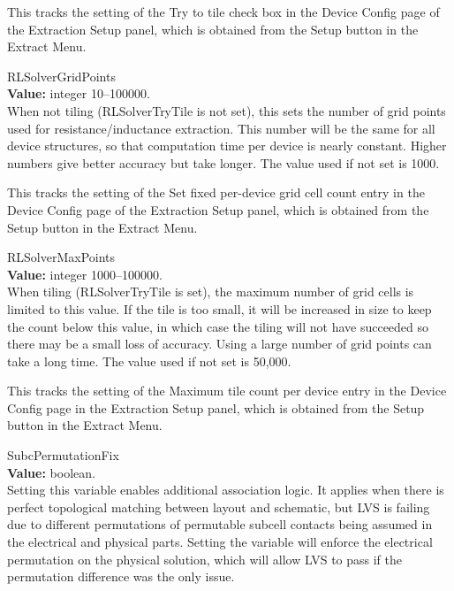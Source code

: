 \begin{description}
This tracks the setting of the {\cb Try to tile} check box in the {\cb
Device Config} page of the {\cb Extraction Setup} panel, which is
obtained from the {\cb Setup} button in the {\cb Extract Menu}.

\item{\et RLSolverGridPoints}\\
{\bf Value:} integer 10--100000.\\
When not tiling ({\et RLSolverTryTile} is not set), this sets the
number of grid points used for resistance/inductance extraction.  This
number will be the same for all device structures, so that computation
time per device is nearly constant.  Higher numbers give better
accuracy but take longer.  The value used if not set is 1000.

This tracks the setting of the {\cb Set fixed per-device grid cell
count} entry in the {\cb Device Config} page of the {\cb Extraction
Setup} panel, which is obtained from the {\cb Setup} button in the
{\cb Extract Menu}.

\item{\et RLSolverMaxPoints}\\
{\bf Value:} integer 1000--100000.\\
When tiling ({\et RLSolverTryTile} is set), the maximum number of grid
cells is limited to this value.  If the tile is too small, it will be
increased in size to keep the count below this value, in which case
the tiling will not have succeeded so there may be a small loss of
accuracy.  Using a large number of grid points can take a long time. 
The value used if not set is 50,000.

This tracks the setting of the {\cb Maximum tile count per device}
entry in the {\cb Device Config} page in the {\cb Extraction Setup}
panel, which is obtained from the {\cb Setup} button in the {\cb
Extract Menu}.

\item{\et SubcPermutationFix}\\
{\bf Value:} boolean.\\
Setting this variable enables additional association logic.  It
applies when there is perfect topological matching between layout and
schematic, but LVS is failing due to different permutations of
permutable subcell contacts being assumed in the electrical and
physical parts.  Setting the variable will enforce the electrical
permutation on the physical solution, which will allow LVS to pass if
the permutation difference was the only issue.
 

\end{description}
